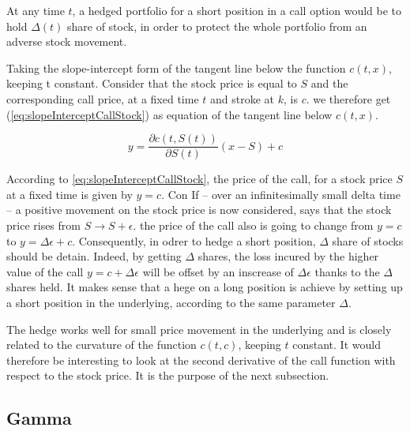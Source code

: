 \documentclass[12pt]{report}
\newcommand{\call}[2]{c\left( #1, #2\right)}
\newcommand{\St}{S\left(t\right)}
\begin{document}
At any time $t$, a hedged portfolio for a short position in a call option would be to hold $\Delta(t)$ share of stock, in order to protect the whole portfolio from an adverse stock movement.

Taking the slope-intercept form of the tangent line below the function $\call{t}{x}$, keeping t constant. Consider that the stock price is equal to $S$ and the corresponding call price, at a fixed time $t$ and stroke at $k$, is $c$. 
we therefore get (\ref{eq:slopeInterceptCallStock}) as equation of the tangent line below $\call{t}{x}$.

\begin{center}
  \begin{equation}
       y  =  \frac{\partial \call{t}{\St}}{\partial \St}  ( x - S) + c
       \label{eq:slopeInterceptCallStock}
  \end{equation}
\end{center}

According to \ref{eq:slopeInterceptCallStock}, the price of the call, for a stock price $S$ at a fixed time is given by $y = c$. Con
If -- over an infinitesimally small delta time -- a positive movement on the stock price is now considered, says that the stock price rises from $S \to S + \epsilon$. the price of the call also is going to change from $y = c$ to $y = \Delta \epsilon + c$.
Consequently, in odrer to hedge a short position, $\Delta$ share of stocks should be detain. Indeed, by getting $\Delta$ shares, the loss incured by the higher value of the call $y = c + \Delta \epsilon$ will be offset by an inscrease of $\Delta \epsilon$ thanks to the $\Delta$ shares held.
It makes sense that a hege on a long position is achieve by setting up a short position in the underlying, according to the same parameter $\Delta$.

The hedge works well for small price movement in the underlying and is closely related to the curvature of the function $\call{t}{c}$, keeping $t$ constant.
It would therefore be interesting to look at the second derivative of the call function with respect to the stock price.
It is the purpose of the next subsection.


\subsection{Gamma}
\label{sub:Gamma}
\end{document}

